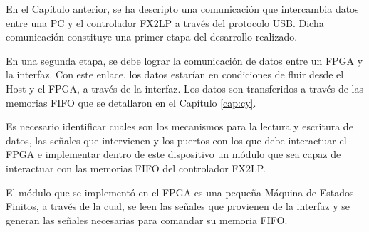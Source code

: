 En el Capítulo anterior, se ha descripto una comunicación que intercambia datos entre una PC y el controlador FX2LP a través del protocolo USB. Dicha comunicación constituye una primer etapa del desarrollo realizado. 

En una segunda etapa, se debe lograr la comunicación de datos entre un FPGA y la interfaz. Con este enlace, los datos estarían en condiciones de fluir desde el Host y el FPGA, a través de la interfaz.  Los datos son transferidos a través de las memorias FIFO que se detallaron en el Capítulo \ref{cap:cy}. 

Es necesario identificar cuales son los mecanismos para la lectura y escritura de datos, las señales que intervienen y los puertos con los que debe interactuar el FPGA e implementar dentro de este dispositivo un módulo que sea capaz de interactuar con las memorias FIFO del controlador FX2LP.

El módulo que se implementó en el FPGA es una pequeña Máquina de Estados Finitos, a través de la cual, se leen las señales que provienen de la interfaz y se generan las señales necesarias para comandar su memoria FIFO.


%	
%	

